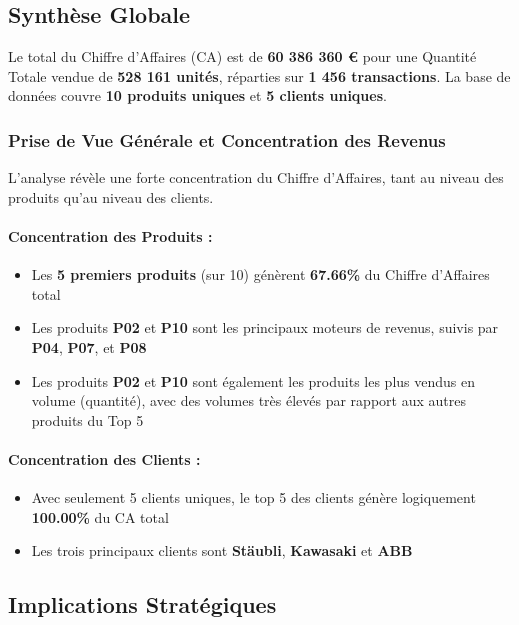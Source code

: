 \documentclass[11pt,a4paper]{article}
\begin{document}
\subsection{Synthèse Globale}

Le total du Chiffre d'Affaires (CA) est de \textbf{60 386 360 €} pour une Quantité Totale vendue de \textbf{528 161 unités}, réparties sur \textbf{1 456 transactions}. La base de données couvre \textbf{10 produits uniques} et \textbf{5 clients uniques}.

\subsubsection{Prise de Vue Générale et Concentration des Revenus}

L'analyse révèle une forte concentration du Chiffre d'Affaires, tant au niveau des produits qu'au niveau des clients.

\paragraph{Concentration des Produits :}
\begin{itemize}[leftmargin=*,itemsep=0.3em]
  \item Les \textbf{5 premiers produits} (sur 10) génèrent \textbf{67.66\%} du Chiffre d'Affaires total
  \item Les produits \textbf{P02} et \textbf{P10} sont les principaux moteurs de revenus, suivis par \textbf{P04}, \textbf{P07}, et \textbf{P08}
  \item Les produits \textbf{P02} et \textbf{P10} sont également les produits les plus vendus en volume (quantité), avec des volumes très élevés par rapport aux autres produits du Top 5
\end{itemize}

\paragraph{Concentration des Clients :}
\begin{itemize}[leftmargin=*,itemsep=0.3em]
  \item Avec seulement 5 clients uniques, le top 5 des clients génère logiquement \textbf{100.00\%} du CA total
  \item Les trois principaux clients sont \textbf{Stäubli}, \textbf{Kawasaki} et \textbf{ABB}
\end{itemize}

\subsection{Implications Stratégiques}
\end{document}
